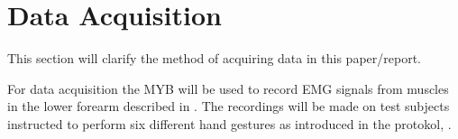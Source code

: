 \section{Data Acquisition} \label{sec:dataAcquisition}

This section will clarify the method of acquiring data in this paper/report.

For data acquisition the MYB will be used to record EMG signals from muscles in the lower forearm described in . The recordings will be made on test subjects instructed to perform six different hand gestures as introduced in the protokol, . 



